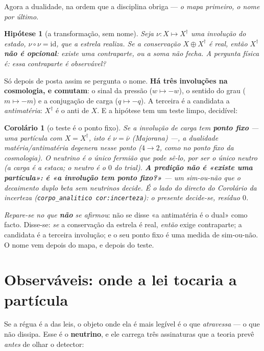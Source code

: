 \documentclass[11pt,a4paper]{article}
\newcommand{\code}[1]{\texttt{\small #1}}
\newtheorem{corolario}[teorema]{Corolário}
\newtheorem{hipotese}[teorema]{Hipótese}
\newcommand{\dg}{^{\dagger}}
\begin{document}
Agora a dualidade, na ordem que a disciplina obriga --- \emph{o mapa primeiro, o nome por último}.

\begin{hipotese}[a transformação, sem nome]\label{hip:dual}
Seja $\nu:X\mapsto X\dg$ uma involução do estado, $\nu\circ\nu=\mathrm{id}$, que a estrela realiza. Se a
conservação $X\oplus X\dg$ é real, então $X\dg$ \textbf{não é opcional}: existe uma contraparte, ou a soma
não fecha. A pergunta física é: \emph{essa contraparte é observável?}
\end{hipotese}

\noindent Só depois de posta assim se pergunta o nome. \textbf{Há três involuções na cosmologia, e
comutam}: o sinal da pressão ($w\mapsto-w$), o sentido do grau ($m\mapsto-m$) e a conjugação de carga
($q\mapsto-q$). A terceira é a candidata a \emph{antimatéria}: $X\dg$ é o anti de $X$. E a hipótese tem um
teste limpo, decidível:

\begin{corolario}[o teste é o ponto fixo]\label{cor:majorana}
Se a involução de carga tem \textbf{ponto fixo} --- uma partícula com $X=X\dg$, isto é $\nu=\bar\nu$
(Majorana) ---, a dualidade matéria/antimatéria degenera nesse ponto ($4\to2$, como no ponto fixo da
cosmologia). O neutrino é o \emph{único} fermião que \emph{pode} sê-lo, por ser o único neutro (a carga é a
estaca; o neutro é o $0$ do trial). \textbf{A predição não é «existe uma partícula»: é «a involução tem
ponto fixo?»} --- um sim-ou-não que o decaimento duplo beta sem neutrinos decide. É o lado do \emph{directo}
do Corolário da incerteza (\code{corpo\_analitico cor:incerteza}): o presente decide-se, resíduo $0$.
\end{corolario}

\noindent \emph{Repare-se no que \textbf{não} se afirmou}: não se disse «a antimatéria é o dual» como
facto. Disse-se: \emph{se} a conservação da estrela é real, \emph{então} exige contraparte; a candidata é a
terceira involução; e o seu ponto fixo é uma medida de sim-ou-não. O nome vem depois do mapa, e depois do
teste.

\section{Observáveis: onde a lei tocaria a partícula}\label{sec:observaveis}

Se a régua é a das leis, o objeto onde ela é mais legível é o que \emph{atravessa} --- o que não dissipa.
Esse é o \textbf{neutrino}, e ele carrega três assinaturas que a teoria prevê \emph{antes} de olhar o
detector:
\end{document}
